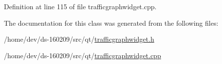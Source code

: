 Definition at line 115 of file trafficgraphwidget.\+cpp.



The documentation for this class was generated from the following files\+:\begin{DoxyCompactItemize}
\item 
/home/dev/ds-\/160209/src/qt/\hyperlink{trafficgraphwidget_8h}{trafficgraphwidget.\+h}\item 
/home/dev/ds-\/160209/src/qt/\hyperlink{trafficgraphwidget_8cpp}{trafficgraphwidget.\+cpp}\end{DoxyCompactItemize}
